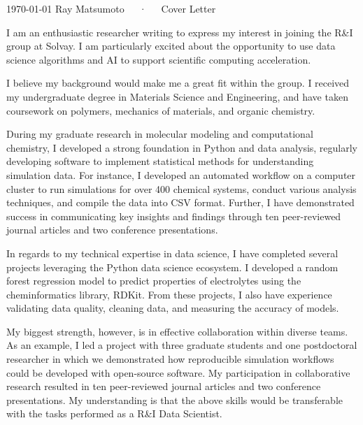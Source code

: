 \documentclass[11pt, a4paper]{awesome-cv}
\begin{document}
\makecvheader[R]

\makecvfooter
  {\today}
  {Ray Matsumoto~~~·~~~Cover Letter}
  {}

\makelettertitle

\begin{cvletter}

I am an enthusiastic researcher writing to express my interest in
    joining the R\&I group at Solvay.
    I am particularly excited about the opportunity to use data science
    algorithms and AI to support scientific computing acceleration.

    I believe my background would make me a great fit within the group.
    I received my undergraduate degree in Materials Science and Engineering, and
    have taken coursework on polymers, mechanics of materials, and organic
    chemistry.

    During my graduate research in molecular modeling and computational
    chemistry, I developed a strong foundation in
    Python and data analysis, regularly developing software to implement
    statistical methods for understanding simulation data.  
    For instance, I developed an automated workflow on a computer cluster to run simulations for over 
    400 chemical systems, conduct various analysis techniques, and compile the data into CSV format.  
    Further, I have demonstrated success in communicating key insights and
    findings through ten peer-reviewed journal articles and two conference
    presentations.

    In regards to my technical expertise in data science, I have completed
     several projects leveraging the Python data science ecosystem.  I developed a
     random forest regression model to predict properties of electrolytes using
     the cheminformatics library, RDKit.  From these projects, I also have
     experience validating data quality, cleaning data, and measuring the
     accuracy of models.

    My biggest strength, however, is in effective collaboration within diverse
    teams.  As an example, I led a project with three graduate students and one
    postdoctoral researcher in which we demonstrated how reproducible simulation workflows could be
    developed with open-source software.  My participation in collaborative
    research resulted in ten peer-reviewed journal articles and two conference presentations.
    My understanding is that the above skills would be
    transferable with the tasks performed as a R\&I Data Scientist.


\end{cvletter}
\end{document}
